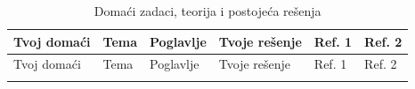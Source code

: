 \documentclass[11pt,a4paper,parskip=half,headsepline,numbers=noenddot]{scrartcl}
\begin{document}
\begin{longtable}[]{@{}
  >{\raggedright\arraybackslash}p{}
  >{\raggedright\arraybackslash}p{}
  >{\raggedright\arraybackslash}p{}
  >{\raggedright\arraybackslash}p{}
  >{\raggedright\arraybackslash}p{}
  >{\raggedright\arraybackslash}p{}@{}}
\caption{Domaći zadaci, teorija i postojeća rešenja}\tabularnewline
\toprule\noalign{}
\begin{minipage}[b]{\linewidth}\raggedright
Tvoj domaći
\end{minipage} & \begin{minipage}[b]{\linewidth}\raggedright
Tema
\end{minipage} & \begin{minipage}[b]{\linewidth}\raggedright
Poglavlje
\end{minipage} & \begin{minipage}[b]{\linewidth}\raggedright
Tvoje rešenje
\end{minipage} & \begin{minipage}[b]{\linewidth}\raggedright
Ref. 1
\end{minipage} & \begin{minipage}[b]{\linewidth}\raggedright
Ref. 2
\end{minipage} \\
\midrule\noalign{}
\endfirsthead
\toprule\noalign{}
\begin{minipage}[b]{\linewidth}\raggedright
Tvoj domaći
\end{minipage} & \begin{minipage}[b]{\linewidth}\raggedright
Tema
\end{minipage} & \begin{minipage}[b]{\linewidth}\raggedright
Poglavlje
\end{minipage} & \begin{minipage}[b]{\linewidth}\raggedright
Tvoje rešenje
\end{minipage} & \begin{minipage}[b]{\linewidth}\raggedright
Ref. 1
\end{minipage} & \begin{minipage}[b]{\linewidth}\raggedright
Ref. 2
\end{minipage} \\
\midrule\noalign{}
\endhead
\bottomrule\noalign{}

\end{longtable}
\end{document}
